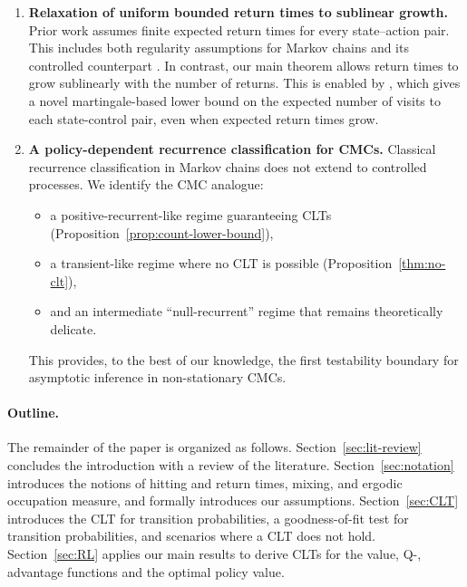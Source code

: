 \documentclass[twoside,11pt]{article}
\numberwithin{equation}{section}
\begin{document}
\begin{enumerate}
    \item \textbf{Relaxation of uniform bounded return times to sublinear growth.} 
    Prior work assumes finite expected return times for every state--action pair. This includes both regularity assumptions for Markov chains \citep[Chapter 11]{meyn_markov_2012} and its controlled counterpart \citep{banerjee2025off}. In contrast, our main theorem allows return times to grow sublinearly with the number of returns. This is enabled by , which gives a novel martingale-based lower bound on the expected number of visits to each state-control pair, even when expected return times grow.
    \item \textbf{A policy-dependent recurrence classification for CMCs.} Classical recurrence classification in Markov chains does not extend to controlled processes. 
    We identify the CMC analogue:
    \begin{itemize}
        \item a positive-recurrent-like regime guaranteeing CLTs (Proposition~\ref{prop:count-lower-bound}),
        \item a transient-like regime where no CLT is possible (Proposition~\ref{thm:no-clt}),
        \item and an intermediate “null-recurrent” regime that remains theoretically delicate.
    \end{itemize}
    This provides, to the best of our knowledge, the first testability boundary for asymptotic inference in non-stationary CMCs.
\end{enumerate}
\paragraph{Outline.}
The remainder of the paper is organized as follows.
Section~\ref{sec:lit-review} concludes the introduction with a review of the literature. 
Section~\ref{sec:notation} introduces the notions of hitting and return times, mixing, and ergodic occupation measure, and formally introduces our assumptions. 
Section~\ref{sec:CLT} introduces the CLT for transition probabilities, a goodness-of-fit test for transition probabilities, and scenarios where a CLT does not hold. 
Section~\ref{sec:RL} applies our main results to derive CLTs for the value, Q-, advantage functions and the optimal policy value. 
\end{document}
